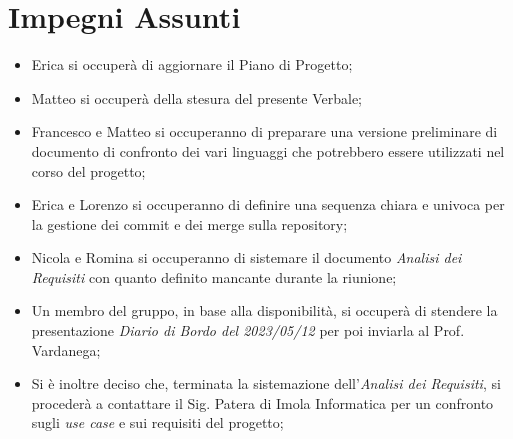 \documentclass[a4paper, 12pt]{article}
\begin{document}
\section*{Impegni Assunti}
\begin{itemize}
    \item Erica si occuperà di aggiornare il Piano di Progetto;
    \item Matteo si occuperà della stesura del presente Verbale;
    \item Francesco e Matteo si occuperanno di preparare una versione preliminare di documento di confronto dei vari linguaggi che potrebbero essere utilizzati nel corso del progetto;
    \item Erica e Lorenzo si occuperanno di definire una sequenza chiara e univoca per la gestione dei commit e dei merge sulla repository;
    \item Nicola e Romina si occuperanno di sistemare il documento \textit{Analisi dei Requisiti} con quanto definito mancante durante la riunione;
    \item Un membro del gruppo, in base alla disponibilità, si occuperà di stendere la presentazione \textit{Diario di Bordo del 2023/05/12} per poi inviarla al Prof. Vardanega;
    \item Si è inoltre deciso che, terminata la sistemazione dell'\textit{Analisi dei Requisiti}, si procederà a contattare il Sig. Patera di Imola Informatica per un confronto sugli \textit{use case} e sui requisiti del progetto;
\end{itemize}
\end{document}
